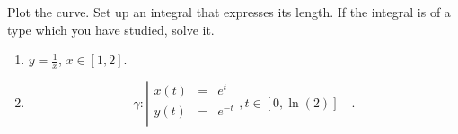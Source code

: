 Plot the curve. Set up an integral that expresses its length. If the integral is of a type which you have studied, solve it.
\begin{enumerate}
\item $y=\frac{1}{x}$, $x\in [1, 2]$.
\item 
\begin{equation*}
\gamma:\left| 
\begin{array}{rcl}
x(t)&=&e^t\\
y(t)&=&e^{-t}\\
\end{array}\right., t\in [0,\ln(2)]\quad .
\end{equation*}
\end{enumerate}
